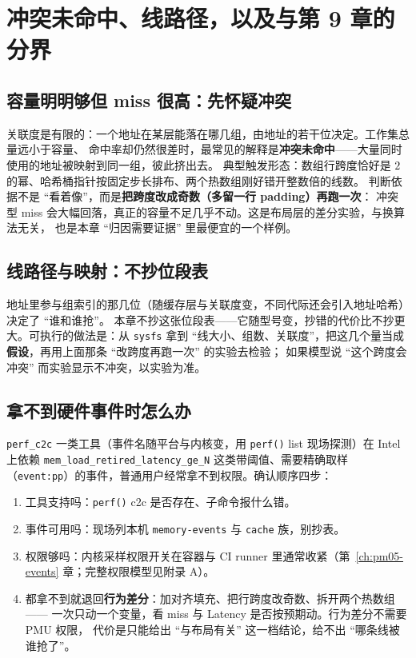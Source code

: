 \documentclass[12pt,a4paper,fontset=fandol]{ctexbook}
\newcommand{\Fn}[1]{\texttt{#1()}}
\newcommand{\Tp}[1]{\texttt{#1}}
\newcommand{\Bk}{\discretionary{}{}{}}
\newcommand{\Lang}[1]{\textsf{#1}}
\newcommand{\MLat}{\Lang{Latency}}
\begin{document}
\section{冲突未命中、线路径，以及与第 9 章的分界}
\label{sec:pm06-conflict}

\subsection{容量明明够但 miss 很高：先怀疑冲突}

关联度是有限的：一个地址在某层能落在哪几组，由地址的若干位决定。工作集总量远小于容量、
命中率却仍然很差时，最常见的解释是\textbf{冲突未命中}——大量同时使用的地址被映射到同一组，彼此挤出去。
典型触发形态：数组行跨度恰好是 $2$ 的幂、哈希桶指针按固定步长排布、两个热数组刚好错开整数倍的线数。
判断依据不是 ``看着像''，而是\textbf{把跨度改成奇数（多留一行 padding）再跑一次}：
冲突型 miss 会大幅回落，真正的容量不足几乎不动。这是布局层的差分实验，与换算法无关，
也是本章 ``归因需要证据'' 里最便宜的一个样例。

\subsection{线路径与映射：不抄位段表}

地址里参与组索引的那几位（随缓存层与关联度变，不同代际还会引入地址哈希）决定了 ``谁和谁抢''。
本章不抄这张位段表——它随型号变，抄错的代价比不抄更大。可执行的做法是：从 \Tp{sysfs} 拿到
``线大小、组数、关联度''，把这几个量当成\textbf{假设}，再用上面那条 ``改跨度再跑一次'' 的实验去检验；
如果模型说 ``这个跨度会冲突'' 而实验显示不冲突，以实验为准。

\subsection{拿不到硬件事件时怎么办}

\Tp{perf{\Bk}\_c2c} 一类工具（事件名随平台与内核变，用 \Fn{perf} list 现场探测）在 Intel 上依赖
\Tp{mem{\Bk}\_load{\Bk}\_retired{\Bk}\_latency{\Bk}\_ge{\Bk}\_N} 这类带阈值、需要精确取样
（\Tp{event:pp}）的事件，普通用户经常拿不到权限。确认顺序四步：
\begin{enumerate}
\item 工具支持吗：\Fn{perf} c2c 是否存在、子命令报什么错。
\item 事件可用吗：现场列本机 \Tp{memory{\Bk}-events} 与 \Tp{cache} 族，别抄表。
\item 权限够吗：内核采样权限开关在容器与 CI runner 里通常收紧（第~\ref{ch:pm05-events} 章；完整权限模型见附录 A）。
\item 都拿不到就退回\textbf{行为差分}：加对齐填充、把行跨度改奇数、拆开两个热数组——
  一次只动一个变量，看 miss 与 \MLat{} 是否按预期动。行为差分不需要 PMU 权限，
  代价是只能给出 ``与布局有关'' 这一档结论，给不出 ``哪条线被谁抢了''。
\end{enumerate}
\end{document}
